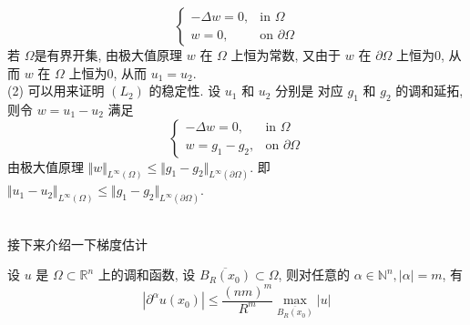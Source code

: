 \documentclass[11pt]{ctexart}[UTF8]
\begin{document}
\begin{equation*}
    \begin{cases}
    -\Delta w = 0, & \text{in } \Omega\\
    w = 0, & \text{on } \partial\Omega
    \end{cases}
\end{equation*}
若 $\Omega$是有界开集, 由极大值原理 $w$ 在 $\Omega$ 上恒为常数, 又由于 $w$ 在 $\partial\Omega$ 上恒为0, 从而 $w$ 在 $\Omega$ 上恒为0, 从而 $u_{1} = u_{2}$.\\
(2) 可以用来证明 $(L_{2})$ 的稳定性. 设 $u_{1}$ 和 $u_{2}$ 分别是 对应 $g_{1}$ 和 $g_{2}$ 的调和延拓, 则令 $w = u_{1} - u_{2}$ 满足
\begin{equation*}
    \begin{cases}
    -\Delta w = 0, & \text{in } \Omega\\
    w = g_{1} - g_{2}, & \text{on } \partial\Omega
    \end{cases}
\end{equation*}
由极大值原理 $\Vert w \Vert_{L^{\infty}(\Omega)} \leq \Vert g_1 - g_2 \Vert_{L^{\infty}(\partial\Omega)}$. 即 $\Vert u_1 - u_2 \Vert_{L^{\infty}(\Omega)} \leq \Vert g_1 - g_2 \Vert_{L^{\infty}(\partial\Omega)}$.\par
~\\
接下来介绍一下梯度估计
\begin{theorem}
    设 $u$ 是 $\Omega \subset \mathbb{R}^n$ 上的调和函数, 设 $\overline{B_{R}(x_{0})} \subset \Omega$, 则对任意的 $\alpha \in \mathbb{N}^n, |\alpha| = m$, 有
    \begin{equation}\label{estimate of gradient}
        | \partial^{\alpha} u(x_{0}) | \leq \frac{(nm)^{m}}{R^{m}} \max\limits_{\overline{B_{R}(x_{0})}} |u|
    \end{equation}
\end{theorem}
\end{document}
